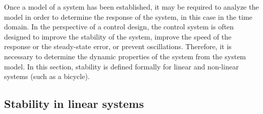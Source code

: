 Once a model of a system has been established, it may be required to analyze the model in order to determine the response of the system, in this case in the time domain. In the perspective of a control design, the control system is often designed to improve the stability of the system, improve the speed of the response or the steady-state error, or prevent oscillations. Therefore, it is necessary to determine the dynamic properties of the system from the system model.
In this section, stability is defined formally for linear and non-linear systems (such as a bicycle).

\subsection{Stability in linear systems} \label{Sec_StabilityLinearSystems}

